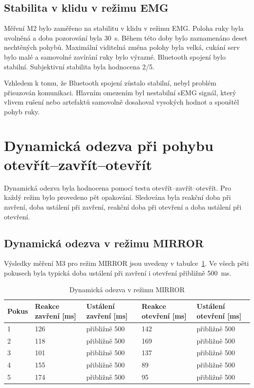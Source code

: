 \subsection{Stabilita v klidu v režimu EMG}
\label{subsec:klid-emg}

Měření M2 bylo zaměřeno na stabilitu v klidu v režimu EMG\@. Poloha ruky byla uvolněná a doba pozorování byla 30~s. Během této doby bylo zaznamenáno deset nechtěných pohybů. Maximální viditelná změna polohy byla velká, cukání serv bylo malé a samovolné zavírání ruky bylo výrazné. Bluetooth spojení bylo stabilní. Subjektivní stabilita byla hodnocena 2/5.

Vzhledem k tomu, že Bluetooth spojení zůstalo stabilní, nebyl problém přisuzován komunikaci. Hlavním omezením byl nestabilní sEMG signál, který vlivem rušení nebo artefaktů samovolně dosahoval vysokých hodnot a spouštěl pohyb ruky.

\section{Dynamická odezva při pohybu otevřít--zavřít--otevřít}
\label{sec:dynamicka-odezva}

Dynamická odezva byla hodnocena pomocí testu otevřít--zavřít--otevřít. Pro každý režim bylo provedeno pět opakování. Sledována byla reakční doba při zavření, doba ustálení při zavření, reakční doba při otevření a doba ustálení při otevření.

\subsection{Dynamická odezva v režimu MIRROR}
\label{subsec:dynamika-mirror}

Výsledky měření M3 pro režim MIRROR jsou uvedeny v tabulce~\ref{tab:mirror-otevrit-zavrit}. Ve všech pěti pokusech byla typická doba ustálení při zavření i otevření přibližně 500~ms.

\begin{table}[htbp]
\centering
\caption{Dynamická odezva v režimu MIRROR}
\label{tab:mirror-otevrit-zavrit}
\begin{tabular}{|p{}|p{}|p{}|p{}|p{}|}
\hline
\textbf{Pokus} & \textbf{Reakce zavření [ms]} & \textbf{Ustálení zavření [ms]} & \textbf{Reakce otevření [ms]} & \textbf{Ustálení otevření [ms]} \\
\hline
1 & 126 & přibližně 500 & 142 & přibližně 500 \\
\hline
2 & 118 & přibližně 500 & 169 & přibližně 500 \\
\hline
3 & 101 & přibližně 500 & 137 & přibližně 500 \\
\hline
4 & 155 & přibližně 500 & 89 & přibližně 500 \\
\hline
5 & 174 & přibližně 500 & 95 & přibližně 500 \\
\hline
\end{tabular}
\end{table}


